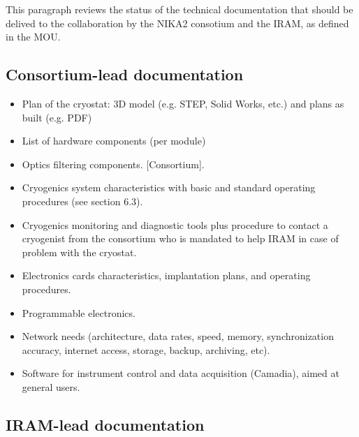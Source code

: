 %

This paragraph reviews the status of the technical documentation that should be delived to the collaboration by the NIKA2 consotium and the IRAM, as defined in the MOU.


\subsection{Consortium-lead documentation}

\begin{itemize}

\item Plan of the cryostat: 3D model (e.g. STEP, Solid Works, etc.) and plans as built (e.g. PDF)
  
\item List of hardware components (per module)

\item Optics filtering components. [Consortium].

\item Cryogenics system characteristics with basic and standard operating procedures (see section 6.3). 

\item Cryogenics monitoring and diagnostic tools plus procedure to contact a cryogenist from the consortium who is mandated to help IRAM in case of problem with the cryostat. 
  
\item  Electronics cards characteristics, implantation plans, and operating procedures. 

\item Programmable electronics.
  
\item Network needs (architecture, data rates, speed, memory, synchronization accuracy, internet access, storage, backup, archiving, etc). 

\item Software for instrument control and data acquisition (Camadia), aimed at general users. 

\end{itemize}


\subsection{IRAM-lead documentation}

